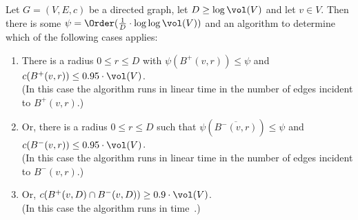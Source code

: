 \begin{lemma} \label{lem:sparse-cut-det}
Let $G = (V, E, c)$ be a directed graph, let $D \geq \log \vol(V)$ and let $v \in V$. Then there is some $\psi = \Order(\frac{1}{D} \cdot \log\log \vol(V))$ and an algorithm to determine which of the following cases applies:
\begin{enumerate}[label=(\roman*)]
	\item There is a radius $0 \leq r \leq D$ with $\psi(B^+(v, r)) \leq \psi$ and $c(B^+(v, r)) \leq 0.95 \cdot \vol(V)$.\\(In this case the algorithm runs in linear time in the number of edges incident to $B^+(v, r)$.)
	\item Or, there is a radius $0 \leq r \leq D$ such that $\psi(\overline{B^-(v, r)}) \leq \psi$ and $c(B^-(v, r)) \leq 0.95 \cdot \vol(V)$.\\(In this case the algorithm runs in linear time in the number of edges incident to $B^-(v, r)$.)
	\item Or, $c(B^+(v, D) \cap B^-(v, D)) \geq 0.9 \cdot \vol(V)$.\\(In this case the algorithm runs in time~.)
\end{enumerate}
\end{lemma}
